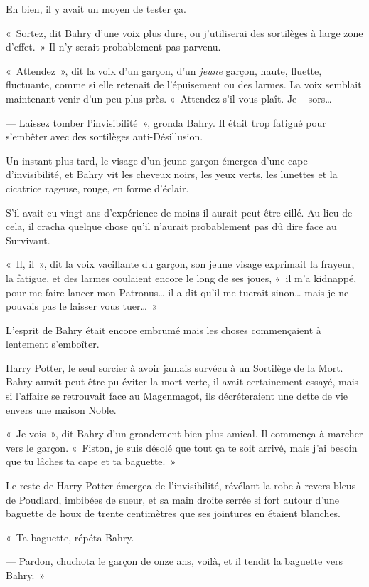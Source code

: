 Eh bien, il y avait un moyen de tester ça.

«~Sortez, dit Bahry d'une voix plus dure, ou j'utiliserai des sortilèges à large zone d'effet.~» Il n'y serait probablement pas parvenu.

«~Attendez~», dit la voix d'un garçon, d'un \emph{jeune} garçon, haute, fluette, fluctuante, comme si elle retenait de l'épuisement ou des larmes. La voix semblait maintenant venir d'un peu plus près. «~Attendez s'il vous plaît. Je -- sors…

--- Laissez tomber l'invisibilité~», gronda Bahry. Il était trop fatigué pour s'embêter avec des sortilèges anti-Désillusion.

Un instant plus tard, le visage d'un jeune garçon émergea d'une cape d'invisibilité, et Bahry vit les cheveux noirs, les yeux verts, les lunettes et la cicatrice rageuse, rouge, en forme d'éclair.

S'il avait eu vingt ans d'expérience de moins il aurait peut-être cillé. Au lieu de cela, il cracha quelque chose qu'il n'aurait probablement pas dû dire face au Survivant.

«~Il, il~», dit la voix vacillante du garçon, son jeune visage exprimait la frayeur, la fatigue, et des larmes coulaient encore le long de ses joues, «~il m'a kidnappé, pour me faire lancer mon Patronus… il a dit qu'il me tuerait sinon… mais je ne pouvais pas le laisser vous tuer…~»

L'esprit de Bahry était encore embrumé mais les choses commençaient à lentement s'emboîter.

Harry Potter, le seul sorcier à avoir jamais survécu à un Sortilège de la Mort. Bahry aurait peut-être pu éviter la mort verte, il avait certainement essayé, mais si l'affaire se retrouvait face au Magenmagot, ils décréteraient une dette de vie envers une maison Noble.

«~Je vois~», dit Bahry d'un grondement bien plus amical. Il commença à marcher vers le garçon. «~Fiston, je suis désolé que tout ça te soit arrivé, mais j'ai besoin que tu lâches ta cape et ta baguette.~»

Le reste de Harry Potter émergea de l'invisibilité, révélant la robe à revers bleus de Poudlard, imbibées de sueur, et sa main droite serrée si fort autour d'une baguette de houx de trente centimètres que ses jointures en étaient blanches.

«~Ta baguette, répéta Bahry.

--- Pardon, chuchota le garçon de onze ans, voilà, et il tendit la baguette vers Bahry.~»

